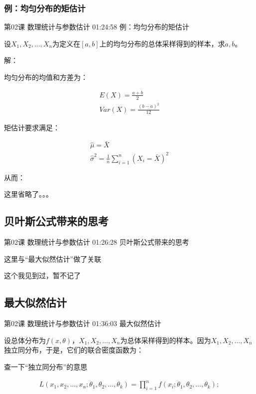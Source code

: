\documentclass[UTF8]{ctexart}
\begin{document}
\subsubsection{例：均匀分布的矩估计}

第02课 数理统计与参数估计 01:24:58 例：均匀分布的矩估计

设$X_ {1},X_{2},\dots,X_{n}$为定义在$[a,b]$上的均匀分布的总体采样得到的样本，求$a,b$。

解：

均匀分布的均值和方差为：

\begin{equation}
\begin{aligned}
E(X)=\frac{a+b}{2} \\
Var(X)=\frac{(b-a)^{2}}{12}
\end{aligned}
\end{equation}

矩估计要求满足：

\begin{equation}
\begin{aligned}
\hat{\mu}=\bar{X} \\
\hat{\sigma}^{2}=\frac{1}{n}\sum_{i=1}^{n}(X_{i}=\bar{X})^{2}
\end{aligned}
\end{equation}

从而：

这里省略了。。。

\subsection{贝叶斯公式带来的思考}

第02课 数理统计与参数估计 01:26:28 贝叶斯公式带来的思考

这里与“最大似然估计”做了关联

这个我见到过，暂不记了

\subsection{最大似然估计}

第02课 数理统计与参数估计 01:36:03 最大似然估计

设总体分布为$f(x,\theta)$，$X_ {1},X_{2},\dots,X_{n}$为总体采样得到的样本。因为$X_ {1},X_{2},\dots,X_{n}$独立同分布，于是，它们的联合密度函数为：

查一下“独立同分布”的意思

\begin{equation}
\begin{aligned}
L(x_{1},x_{2},\dots,x_{n};\theta_{1},\theta_{2},\dots,\theta_{k})
=\prod_{i=1}^{n} f(x_{i};\theta_{1},\theta_{2},\dots,\theta_{k});
\end{aligned}
\end{equation}
\end{document}
